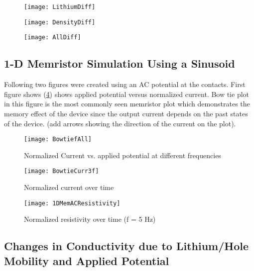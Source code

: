 {\begin{figure}[!htp]
\centering
\texttt{[image: LithiumDiff]}
\caption{} 
\label{}
\end{figure}


\begin{figure}[!htp]
\centering
\texttt{[image: DensityDiff]}
\caption{} 
\label{}
\end{figure}


\begin{figure}[!htp]
\centering
\texttt{[image: AllDiff]}
\caption{} 
\label{}
\end{figure}



\clearpage
\subsection{1-D Memristor Simulation Using a Sinusoid}


Following two figures were created using an AC potential at the contacts. First figure shows (\ref{Bowtie}) shows applied potential versus normalized current. Bow tie plot in this figure is the most commonly seen memristor plot which demonstrates the memory effect of the device since the output current depends on the past states of the device. (add arrows showing the direction of the current on the plot). 
\begin{landscape}
\begin{figure}[!htp]
\centering
\texttt{[image: BowtiefAll]}
\caption{Normalized Current vs. applied potential at different frequencies} 
\label{Bowtie}
\end{figure}
\end{landscape} 

   
\begin{figure}[!htp]
\centering
\texttt{[image: BowtieCurr3f]}
\caption{Normalized current over time} 
\label{}
\end{figure}


\begin{landscape}
\begin{figure}[!htp]
\centering
\texttt{[image: 1DMemACResistivity]}
\caption{Normalized resistivity over time (f = 5 Hz)} 
\label{}
\end{figure}
\end{landscape} 



\clearpage
\subsection{Changes in Conductivity due to Lithium/Hole Mobility and Applied Potential}

}
